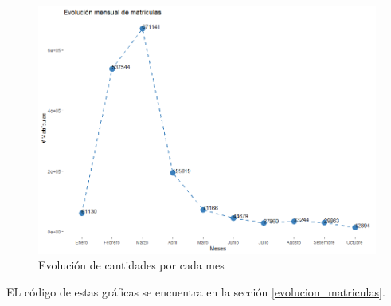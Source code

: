 \begin{figure}[th]
\centering
\includegraphics[width=1.2\textwidth]{Figures/matriculas2022}
\decoRule
\caption[Matrículas 2022]{Evolución de cantidades por cada mes}
\label{fig:matriculas2022}
\end{figure}

EL código de estas gráficas se encuentra en la sección \ref{evolucion_matriculas}.